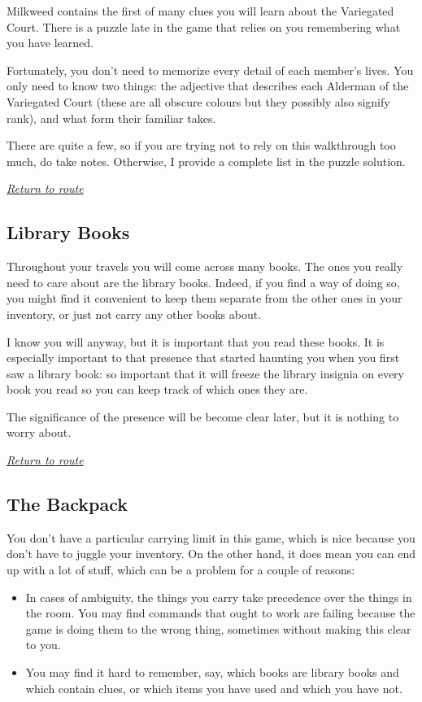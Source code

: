 \documentclass[a5paper]{extarticle}
\begin{document}
Milkweed contains the first of many clues you will learn about the
Variegated Court. There is a puzzle late in the game that relies on you
remembering what you have learned.

Fortunately, you don't need to memorize every detail of each member's lives.
You only need to know two things: the adjective that describes each Alderman
of the Variegated Court (these are all obscure colours but they possibly also
signify rank), and what form their familiar takes.

There are quite a few, so if you are trying not to rely on this walkthrough too
much, do take notes. Otherwise, I provide a complete list in the puzzle
solution.

\hyperref[sec:route]{\emph{Return to route}}

\newpage
\subsection{Library Books}\label{sec:nb-library-books}

Throughout your travels you will come across many books. The ones you really
need to care about are the library books. Indeed, if you find a way of doing so,
you might find it convenient to keep them separate from the other ones in your
inventory, or just not carry any other books about.

I know you will anyway, but it is important that you read these books.
It is especially important to that presence that started haunting you when you
first saw a library book: so important that it will freeze the library insignia
on every book you read so you can keep track of which ones they are.

The significance of the presence will be become clear later, but it is nothing
to worry about.

\hyperref[sec:route]{\emph{Return to route}}

\newpage
\subsection{The Backpack}\label{sec:nb-backpack}

You don't have a particular carrying limit in this game,
which is nice because you don't have to juggle your inventory.
On the other hand, it does mean you can end up with a lot of stuff,
which can be a problem for a couple of reasons:

\begin{itemize}
\item
  In cases of ambiguity, the things you carry take precedence over the things
  in the room. You may find commands that ought to work are failing because
  the game is doing them to the wrong thing, sometimes without making this
  clear to you.
\item
  You may find it hard to remember, say, which books are library books and
  which contain clues, or which items you have used and which you have not.
\end{itemize}
\end{document}
